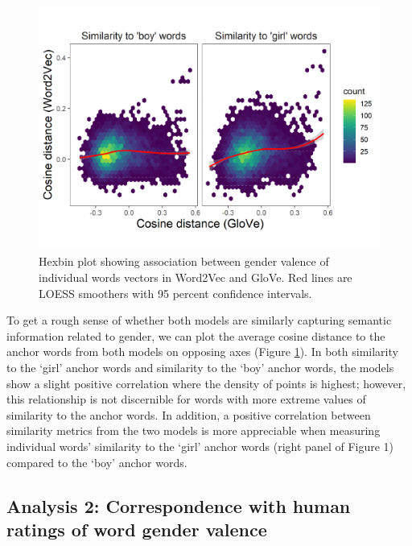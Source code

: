 \documentclass[10pt, letterpaper]{article}
\newenvironment{CodeChunk}{}{}
\begin{document}
\begin{CodeChunk}
\begin{figure}[h]

{\centering \includegraphics{figs/corr_plot-1} 

}

\caption[Hexbin plot showing association between gender valence of individual words vectors in Word2Vec and GloVe]{Hexbin plot showing association between gender valence of individual words vectors in Word2Vec and GloVe. Red lines are LOESS smoothers with 95 percent confidence intervals.}\label{fig:corr_plot}
\end{figure}
\end{CodeChunk}

To get a rough sense of whether both models are similarly capturing
semantic information related to gender, we can plot the average cosine
distance to the anchor words from both models on opposing axes (Figure
\ref{fig:corr_plot}). In both similarity to the `girl' anchor words and
similarity to the `boy' anchor words, the models show a slight positive
correlation where the density of points is highest; however, this
relationship is not discernible for words with more extreme values of
similarity to the anchor words. In addition, a positive correlation
between similarity metrics from the two models is more appreciable when
measuring individual words' similarity to the `girl' anchor words (right
panel of Figure 1) compared to the `boy' anchor words.

\hypertarget{analysis-2-correspondence-with-human-ratings-of-word-gender-valence}{%
\subsection{Analysis 2: Correspondence with human ratings of word gender
valence}\label{analysis-2-correspondence-with-human-ratings-of-word-gender-valence}}
\end{document}
